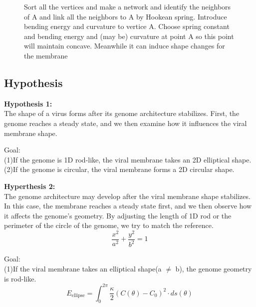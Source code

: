 \documentclass[12pt]{article}
\begin{document}
\begin{flushleft}
\begin{figure}[!ht]
  \centering
  \caption{Sort all the vertices and make a network and identify the neighbors of A and link all the neighbors to A by Hookean spring. Introduce bending energy and curvature to vertice A.
Choose spring constant and bending energy and (may be) curvature at point A so this point will maintain concave. Meanwhile it can induce shape changes for the membrane}
\end{figure}


\subsection*{Hypothesis}

\noindent \textbf{Hypothesis 1:}\\
The shape of a virus forms after its genome architecture stabilizes. First, the genome reaches a steady state, and we then examine how it influences the viral membrane shape. 

\noindent Goal:\\
	(1)If the genome is 1D rod-like, the viral membrane takes an 2D elliptical shape.\\
	(2)If the genome is circular, the viral membrane forms a 2D circular shape.
	
\noindent \textbf{Hyperthesis 2:}\\
The genome architecture may develop after the viral membrane shape stabilizes. In this case, the membrane reaches a steady state first, and we then observe how it affects the genome’s geometry. By adjusting the length of 1D rod or the perimeter of the circle of the genome, we try to match the reference.\cite{goldsmith2003monkeypox}\\
 
\begin{equation}
\frac{x^2}{a^2} + \frac{y^2}{b^2} = 1
\end{equation}

\noindent Goal:\\
	(1)If the viral membrane takes an elliptical shape(a $\neq$ b), the genome geometry is rod-like\cite{harish2021entomopathogenic}.	\\
	\begin{equation}
E_{\text{ellipse}} = \int_0^{2\pi} \frac{\kappa}{2} \left( C(\theta) - C_0 \right)^2 \cdot ds(\theta)
\end{equation}
	
	
	

\end{flushleft}
\end{document}

